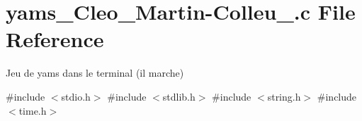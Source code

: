 \hypertarget{yams___cleo___martin-_colleu__2_80_8c}{}\section{yams\+\_\+\+Cleo\+\_\+\+Martin-\/\+Colleu\+\_.c File Reference}
\label{yams___cleo___martin-_colleu__2_80_8c}


Jeu de yams dans le terminal (il marche)  


{\ttfamily \#include $<$stdio.\+h$>$}\newline
{\ttfamily \#include $<$stdlib.\+h$>$}\newline
{\ttfamily \#include $<$string.\+h$>$}\newline
{\ttfamily \#include $<$time.\+h$>$}\newline
